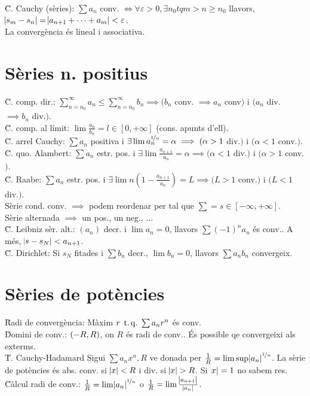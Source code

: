 \u{C. Cauchy (sèries)}: $\sum a_n$ conv. $\iff \forall \varepsilon > 0, \exists n_0 tq m>n\geq n_0$ llavors, $\abs{s_m-s_n} = \abs{a_{n+1} + \dots + a_m} < \varepsilon$. \\
\ci La convergència és lineal i associativa.

\section{Sèries n. positius}

\u{C. comp. dir.}: $\sum_{n=n_0}^\infty a_n \leq \sum_{n=n_0}^\infty b_n \implies (b_n$ conv. $\implies a_n$ conv$)$ i $(a_n$ div. $\implies b_n$ div.$)$. \\
\u{C. comp. al límit}: $\lim\frac{a_n}{b_n}=l\in[0,+\infty]$ (cons. apunts d'ell).\\
\u{C. arrel Cauchy}: $\sum a_n$ positiva i $\exists \lim a_n^{\nicefrac{1}{n}}=\alpha \implies (\alpha >1$ div.$)$ i $(\alpha < 1$ conv.$)$.\\
\u{C. quo. Alambert}: $\sum a_n$ estr. pos. i $\exists\lim\frac{a_{n+1}}{a_n}=\alpha \implies (\alpha <1$ div.$)$ i $(\alpha > 1$ conv.$)$.\\
\u{C. Raabe}: $\sum a_n$ estr. pos. i $\exists\lim n\left(1-\frac{a_{n+1}}{a_n}\right) = L \implies (L > 1$ conv.$)$ i $(L<1$ div.$)$.\\
\ci Sèrie cond. conv. $\implies$ podem reordenar per tal que $\sum = s\in\left[-\infty, +\infty\right]$.\\
\ci Sèrie alternada $\implies$ un pos., un neg., ... \\
\u{C. Leibniz sèr. alt.}: $(a_n)$ decr. i $\lim a_n = 0$, llavors $\sum (-1)^na_n$ és conv.. A més, $\abs{s-s_N} < a_{n+1}$. \\
\u{C. Dirichlet}: Si $s_N$ fitades i $\sum b_n$ decr., $\lim b_n = 0$, llavors $\sum a_nb_n$ convergeix.

\section{Sèries de potències}

\u{Radi de convergència}: Màxim $r \operatorname{\;t.q.\;} \sum a_nr^n$ és conv. \\
\u{Domini de conv.}: $\left( -R, R\right)$, on $R$ és radi de conv.. És possible qe convergeixi als exterms. \\
\u{T. Cauchy-Hadamard} Sigui $\sum a_nx^n, R$ ve donada per $\frac{1}{R} = \lim \sup \abs{a_n}^{\nicefrac{1}{n}}$. La sèrie de potències és abs. conv. si $\abs{x} < R$ i div. si $\abs{x} > R$. Si $\abs{x} = 1$ no sabem res. \\
\u{Càlcul radi de conv.}: $\frac{1}{R} = \lim \abs{a_n}^{\nicefrac{1}{n}}$ o $\frac{1}{R} = \lim\frac{\abs{a_{n+1}}}{\abs{a_n}}$.

